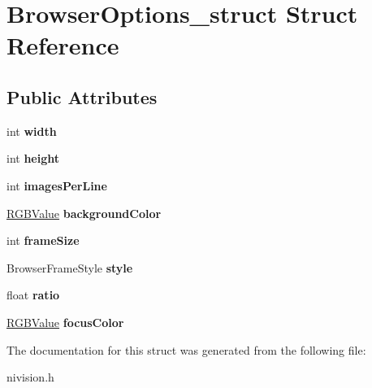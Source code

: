 \hypertarget{structBrowserOptions__struct}{
\section{BrowserOptions\_\-struct Struct Reference}
\label{structBrowserOptions__struct}
}
\subsection*{Public Attributes}
\begin{DoxyCompactItemize}
\item 
\hypertarget{structBrowserOptions__struct_a56c706f4999f0ef8f265196bebc1c660}{
int {\bfseries width}}
\label{structBrowserOptions__struct_a56c706f4999f0ef8f265196bebc1c660}

\item 
\hypertarget{structBrowserOptions__struct_ae85f16490b44c41045f7cb71912f4c9e}{
int {\bfseries height}}
\label{structBrowserOptions__struct_ae85f16490b44c41045f7cb71912f4c9e}

\item 
\hypertarget{structBrowserOptions__struct_a9441e97e72c5f7a93e699e892bae8e23}{
int {\bfseries imagesPerLine}}
\label{structBrowserOptions__struct_a9441e97e72c5f7a93e699e892bae8e23}

\item 
\hypertarget{structBrowserOptions__struct_aa2f8b2e3e202010802dd125c2eff9be0}{
\hyperlink{structRGBValue__struct}{RGBValue} {\bfseries backgroundColor}}
\label{structBrowserOptions__struct_aa2f8b2e3e202010802dd125c2eff9be0}

\item 
\hypertarget{structBrowserOptions__struct_aa26343ec15ea71ff983c13339aeaccf0}{
int {\bfseries frameSize}}
\label{structBrowserOptions__struct_aa26343ec15ea71ff983c13339aeaccf0}

\item 
\hypertarget{structBrowserOptions__struct_a44a1ca96d03c7bfbeaac272322293ea3}{
BrowserFrameStyle {\bfseries style}}
\label{structBrowserOptions__struct_a44a1ca96d03c7bfbeaac272322293ea3}

\item 
\hypertarget{structBrowserOptions__struct_a89c1b15549e8b5f7577a63f67c345fe1}{
float {\bfseries ratio}}
\label{structBrowserOptions__struct_a89c1b15549e8b5f7577a63f67c345fe1}

\item 
\hypertarget{structBrowserOptions__struct_a84b9354e7fa00c044b5c61994030a930}{
\hyperlink{structRGBValue__struct}{RGBValue} {\bfseries focusColor}}
\label{structBrowserOptions__struct_a84b9354e7fa00c044b5c61994030a930}

\end{DoxyCompactItemize}


The documentation for this struct was generated from the following file:\begin{DoxyCompactItemize}
\item 
nivision.h\end{DoxyCompactItemize}
